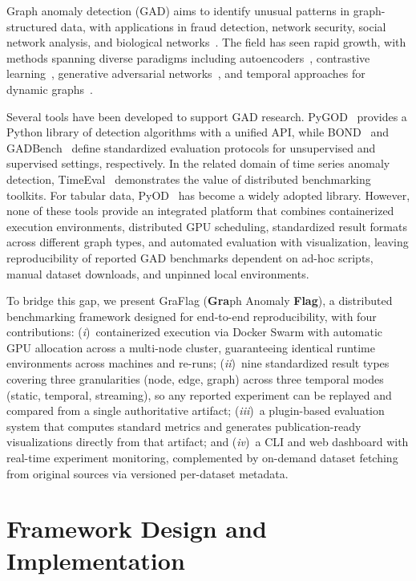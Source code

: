 \documentclass[twoside,11pt]{article}
\begin{document}
Graph anomaly detection (GAD) aims to identify unusual patterns in graph-structured data, with applications in fraud detection, network security, social network analysis, and biological networks~\citep{ma2021comprehensive}. The field has seen rapid growth, with methods spanning diverse paradigms including autoencoders~\citep{ding2019dominant,fan2020anomalydae}, contrastive learning~\citep{xu2022conad,liu2021cola}, generative adversarial networks~\citep{chen2020gaan}, and temporal approaches for dynamic graphs~\citep{liu2023taddy,zheng2019addgraph}.

Several tools have been developed to support GAD research. PyGOD~\citep{liu2024pygod} provides a Python library of detection algorithms with a unified API, while BOND~\citep{liu2022bond} and GADBench~\citep{tang2023gadbench} define standardized evaluation protocols for unsupervised and supervised settings, respectively. In the related domain of time series anomaly detection, TimeEval~\citep{wenig2022timeeval} demonstrates the value of distributed benchmarking toolkits. For tabular data, PyOD~\citep{zhao2019pyod} has become a widely adopted library. However, none of these tools provide an integrated platform that combines containerized execution environments, distributed GPU scheduling, standardized result formats across different graph types, and automated evaluation with visualization, leaving reproducibility of reported GAD benchmarks dependent on ad-hoc scripts, manual dataset downloads, and unpinned local environments.

To bridge this gap, we present GraFlag (\textbf{Gra}ph Anomaly \textbf{Flag}), a distributed benchmarking framework designed for end-to-end reproducibility, with four contributions: (\emph{i})~containerized execution via Docker Swarm with automatic GPU allocation across a multi-node cluster, guaranteeing identical runtime environments across machines and re-runs; (\emph{ii})~nine standardized result types covering three granularities (node, edge, graph) across three temporal modes (static, temporal, streaming), so any reported experiment can be replayed and compared from a single authoritative artifact; (\emph{iii})~a plugin-based evaluation system that computes standard metrics and generates publication-ready visualizations directly from that artifact; and (\emph{iv})~a CLI and web dashboard with real-time experiment monitoring, complemented by on-demand dataset fetching from original sources via versioned per-dataset metadata.

\section{Framework Design and Implementation}
\end{document}
